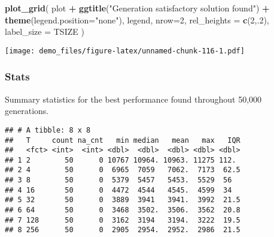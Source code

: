 \documentclass[]{book}
\newenvironment{Shaded}{\begin{snugshade}}{\end{snugshade}}
\newcommand{\DataTypeTok}[1]{\textcolor[rgb]{0.13,0.29,0.53}{#1}}
\newcommand{\DecValTok}[1]{\textcolor[rgb]{0.00,0.00,0.81}{#1}}
\newcommand{\KeywordTok}[1]{\textcolor[rgb]{0.13,0.29,0.53}{\textbf{#1}}}
\newcommand{\NormalTok}[1]{#1}
\newcommand{\OperatorTok}[1]{\textcolor[rgb]{0.81,0.36,0.00}{\textbf{#1}}}
\newcommand{\OtherTok}[1]{\textcolor[rgb]{0.56,0.35,0.01}{#1}}
\newcommand{\StringTok}[1]{\textcolor[rgb]{0.31,0.60,0.02}{#1}}
\begin{document}
\begin{Shaded}
\begin{Highlighting}[]
\KeywordTok{plot_grid}\NormalTok{(}
\NormalTok{  plot }\OperatorTok{+}
\StringTok{    }\KeywordTok{ggtitle}\NormalTok{(}\StringTok{"Generation satisfactory solution found"}\NormalTok{) }\OperatorTok{+}
\StringTok{    }\KeywordTok{theme}\NormalTok{(}\DataTypeTok{legend.position=}\StringTok{"none"}\NormalTok{),}
\NormalTok{  legend,}
  \DataTypeTok{nrow=}\DecValTok{2}\NormalTok{,}
  \DataTypeTok{rel_heights =} \KeywordTok{c}\NormalTok{(}\DecValTok{2}\NormalTok{,.}\DecValTok{2}\NormalTok{),}
  \DataTypeTok{label_size =}\NormalTok{ TSIZE}
\NormalTok{)}
\end{Highlighting}
\end{Shaded}

\texttt{[image: demo\_files/figure-latex/unnamed-chunk-116-1.pdf]}

\hypertarget{stats-21}{%
\subsubsection{Stats}\label{stats-21}}

Summary statistics for the best performance found throughout 50,000 generations.

\begin{Shaded}
\end{Shaded}

\begin{verbatim}
## # A tibble: 8 x 8
##   T     count na_cnt   min median   mean   max   IQR
##   <fct> <int>  <int> <dbl>  <dbl>  <dbl> <dbl> <dbl>
## 1 2        50      0 10767 10964. 10963. 11275 112. 
## 2 4        50      0  6965  7059   7062.  7173  62.5
## 3 8        50      0  5379  5457   5453.  5529  56  
## 4 16       50      0  4472  4544   4545.  4599  34  
## 5 32       50      0  3889  3941   3941.  3992  21.5
## 6 64       50      0  3468  3502.  3506.  3562  20.8
## 7 128      50      0  3162  3194   3194.  3222  19.5
## 8 256      50      0  2905  2954.  2952.  2986  21.5
\end{verbatim}
\end{document}
